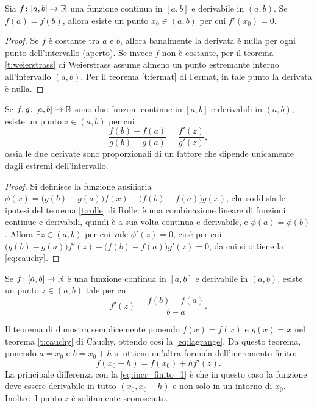 \begin{teorema}[Rolle]
\label{t:rolle}
Sia $f\colon [a,b]\to\mathbb{R}$ una funzione continua in $[a,b]$ e derivabile in $(a,b)$. Se $f(a)=f(b)$, allora esiste un punto $x_0\in (a,b)$ per cui $f'(x_0)=0$.
\end{teorema}
\begin{proof}
Se $f$ è costante tra $a$ e $b$, allora banalmente la derivata è nulla per ogni punto dell'intervallo (aperto).
Se invece $f$ non è costante, per il teorema \ref{t:weierstrass} di Weierstrass assume almeno un punto estremante interno all'intervallo $(a,b)$. Per il teorema \ref{t:fermat} di Fermat, in tale punto la derivata è nulla.
\end{proof}


\begin{teorema}[Cauchy]
\label{t:cauchy}
Se $f,g\colon[a,b]\to\mathbb{R}$ sono due funzoni continue in $[a,b]$ e derivabili in $(a,b)$, esiste un punto $z\in(a,b)$ per cui
\begin{equation}
\label{eq:cauchy}
\frac{f(b)-f(a)}{g(b)-g(a)}=\frac{f'(z)}{g'(z)},
\end{equation}
ossia le due derivate sono proporzionali di un fattore che dipende unicamente dagli estremi dell'intervallo.
\end{teorema}
\begin{proof}
Si definisce la funzione ausiliaria $\phi(x)=\big(g(b)-g(a)\big)f(x)-\big(f(b)-f(a)\big)g(x)$, che soddisfa le ipotesi del teorema \ref{t:rolle} di Rolle: è una combinazione lineare di funzioni continue e derivabili, quindi è a sua volta continua e derivabile, e $\phi(a)=\phi(b)$. Allora $\exists z\in(a,b)$ per cui vale $\phi'(z)=0$, cioè per cui $\big(g(b)-g(a)\big)f'(z)-\big(f(b)-f(a)\big)g'(z)=0$, da cui si ottiene la \eqref{eq:cauchy}.
\end{proof}
\begin{teorema}[Lagrange]
\label{t:lagrange}
Se $f\colon[a,b]\to\mathbb{R}$ è una funzione continua in $[a,b]$ e derivabile in $(a,b)$, esiste un punto $z\in(a,b)$ tale per cui
\begin{equation}
\label{eq:lagrange}
f'(z)=\frac{f(b)-f(a)}{b-a}.
\end{equation}
\end{teorema}
Il teorema di dimostra semplicemente ponendo $f(x)=f(x)$ e $g(x)=x$ nel teorema \ref{t:cauchy} di Cauchy, ottendo così la \eqref{eq:lagrange}.
Da questo teorema, ponendo $a=x_0$ e $b=x_0+h$ si ottiene un'altra formula dell'incremento finito:
\begin{equation}
\label{eq:incr_finito_2}
f(x_0+h)=f(x_0)+hf'(z).
\end{equation}
La principale differenza con la \ref{eq:incr_finito_1} è che in questo caso la funzione deve essere derivabile in tutto $(x_0,x_0+h)$ e non solo in un intorno di $x_0$. Inoltre il punto $z$ è solitamente sconosciuto.

